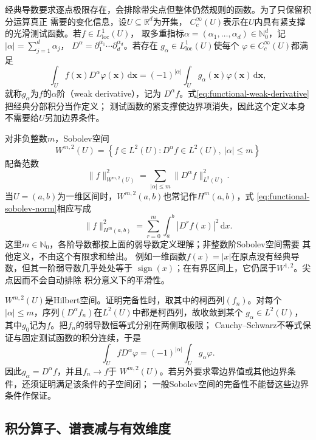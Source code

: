 经典导数要求逐点极限存在，会排除带尖点但整体仍然规则的函数。为了只保留积分运算真正
需要的变化信息，设$U\subseteq\mathbb{R}^d$为开集，
$C_c^\infty(U)$表示在$U$内具有紧支撑的光滑测试函数。若$f\in L^1_{\mathrm{loc}}(U)$，
取多重指标$\alpha=(\alpha_1,\ldots,\alpha_d)\in\mathbb{N}_0^d$，记
$|\alpha|=\sum_{j=1}^d\alpha_j$，
$D^\alpha=\partial_1^{\alpha_1}\cdots\partial_d^{\alpha_d}$。若存在
$g_\alpha\in L^1_{\mathrm{loc}}(U)$使每个
$\varphi\in C_c^\infty(U)$都满足
\begin{equation}
  \int_U f(\bm{x})D^\alpha\varphi(\bm{x})\,\mathrm{d}\bm{x}
  =
  (-1)^{|\alpha|}
  \int_U g_\alpha(\bm{x})\varphi(\bm{x})\,\mathrm{d}\bm{x},
  \label{eq:functional-weak-derivative}
\end{equation}
就称$g_\alpha$为$f$的$\alpha$阶（weak derivative），记为
$D^\alpha f$。式\eqref{eq:functional-weak-derivative}把经典分部积分当作定义；
测试函数的紧支撑使边界项消失，因此这个定义本身不需要给$U$另加边界条件。

对非负整数$m$，Sobolev空间
\[
  W^{m,2}(U)
  =
  \left\{
    f\in L^2(U):
    D^\alpha f\in L^2(U),\ |\alpha|\leq m
  \right\}
\]
配备范数
\begin{equation}
  \lVert f\rVert_{W^{m,2}(U)}^2
  =
  \sum_{|\alpha|\leq m}
  \lVert D^\alpha f\rVert_{L^2(U)}^2.
  \label{eq:functional-sobolev-norm}
\end{equation}
当$U=(a,b)$为一维区间时，$W^{m,2}(a,b)$也常记作$H^m(a,b)$，式
\eqref{eq:functional-sobolev-norm}相应写成
\[
  \lVert f\rVert_{H^m(a,b)}^2
  =
  \sum_{r=0}^{m}
  \int_a^b|D^r f(x)|^2\,\mathrm{d}x.
\]
这里$m\in\mathbb{N}_0$，各阶导数都按上面的弱导数定义理解；非整数阶Sobolev空间需要
其他定义，不由这个有限求和给出。
例如一维函数$f(x)=|x|$在原点没有经典导数，但其一阶弱导数几乎处处等于
$\operatorname{sign}(x)$；在有界区间上，它仍属于$W^{1,2}$。尖点因而不会自动排除
积分意义下的平滑性。

$W^{m,2}(U)$是Hilbert空间。证明完备性时，取其中的柯西列$(f_n)$。对每个
$|\alpha|\leq m$，序列$(D^\alpha f_n)$在$L^2(U)$中都是柯西列，故收敛到某个
$g_\alpha\in L^2(U)$，其中$g_0$记为$f$。把$f_n$的弱导数恒等式分别在两侧取极限；
Cauchy--Schwarz不等式保证与固定测试函数的积分连续，于是
\[
  \int_U fD^\alpha\varphi
  =
  (-1)^{|\alpha|}\int_U g_\alpha\varphi.
\]
因此$g_\alpha=D^\alpha f$，并且$f_n\to f$于
$W^{m,2}(U)$。若另外要求零边界值或其他边界条件，还须证明满足该条件的子空间闭；
一般Sobolev空间的完备性不能替这些边界条件作保证。

\subsection{积分算子、谱衰减与有效维度}

